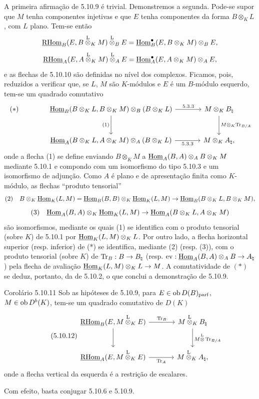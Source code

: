 A primeira afirmação de 5.10.9 é trivial. Demonstremos a segunda. Pode-se supor que $M$ tenha componentes injetivas e que $E$ tenha componentes da forma $B\otimes_KL$, com $L$ plano. Tem-se então
\[
\underline{\mathrm{RHom}}_B(E,B\overset{\mathrm L}{\otimes}_KM)\overset{\mathrm L}{\otimes}_BE=\underline{\operatorname{Hom}}_B^\bullet(E,B\otimes_KM)\otimes_BE,
\]
\[
\underline{\mathrm{RHom}}_A(E,A\overset{\mathrm L}{\otimes}_KM)\overset{\mathrm L}{\otimes}_AE=\underline{\operatorname{Hom}}_A^\bullet(E,A\otimes_KM)\otimes_AE,
\]
e as flechas de 5.10.10 são definidas no nível dos complexos. Ficamos, pois, reduzidos a verificar que, se $L$, $M$ são $K$-módulos e $E$ é um $B$-módulo esquerdo, tem-se um quadrado comutativo
\[
\begin{tikzcd}[column sep=large,row sep=large]
|[alias=star]| {(*)} & \uHom_B(B\otimes_KL,B\otimes_KM)\otimes_B(B\otimes_KL) \arrow[r,"5.3.3"] \arrow[d,"(1)"'] & M\otimes_KB_\natural \arrow[d,"M\otimes_K\Tr_{B/A}"]\\
& \uHom_A(B\otimes_KL,A\otimes_KM)\otimes_A(B\otimes_KL) \arrow[r,"5.3.3"'] & M\otimes_KA_\natural,
\end{tikzcd}
\]
onde a flecha (1) se define enviando $B\otimes_KM$ a $\underline{\operatorname{Hom}}_A(B,A)\otimes_AB\otimes_KM$ mediante 5.10.1 e compondo com um isomorfismo do tipo 5.10.3 e um isomorfismo de adjunção. Como $A$ é plano e de apresentação finita como $K$-módulo, as flechas ``produto tensorial''
\[
\text{(2)}\quad B\otimes_K\underline{\operatorname{Hom}}_K(L,M)=\underline{\operatorname{Hom}}_B(B,B)\otimes_K\underline{\operatorname{Hom}}_K(L,M)\to\underline{\operatorname{Hom}}_B(B\otimes_KL,B\otimes_KM),
\]
\[
\text{(3)}\quad \underline{\operatorname{Hom}}_A(B,A)\otimes_K\underline{\operatorname{Hom}}_K(L,M)\to\underline{\operatorname{Hom}}_A(B\otimes_KL,A\otimes_KM)
\]
são isomorfismos, mediante os quais (1) se identifica com o produto tensorial (sobre $K$) de 5.10.1 por $\underline{\operatorname{Hom}}_K(L,M)\otimes_KL$. Por outro lado, a flecha horizontal superior (resp. inferior) de (*) se identifica, mediante (2) (resp. (3)), com o produto tensorial (sobre $K$) de $\operatorname{Tr}_B:B\to B_\natural$ (resp. $\mathrm{ev}:\underline{\operatorname{Hom}}_A(B,A)\otimes_AB\to A_\natural$) pela flecha de avaliação $\underline{\operatorname{Hom}}_K(L,M)\otimes_KL\to M$. A comutatividade de $(*)$ se deduz, portanto, da de 5.10.2, o que conclui a demonstração de 5.10.9.

\begin{statement}{Corolário 5.10.11}
Sob as hipóteses de 5.10.9, para $E\in\operatorname{ob} D(B)_{\mathrm{parf}}$, $M\in\operatorname{ob} D^b(K)$, tem-se um quadrado comutativo de $D(K)$
\begin{equation}\tag{5.10.12}
\begin{tikzcd}[column sep=large,row sep=large]
\uRHom_B(E,M\lten_KE) \arrow[r,"\Tr_B"] \arrow[d] & M\lten_KB_\natural \arrow[d,"M\lten\Tr_{B/A}"]\\
\uRHom_A(E,M\lten_KE) \arrow[r,"\Tr_A"'] & M\lten_KA_\natural,
\end{tikzcd}
\end{equation}
onde a flecha vertical da esquerda é a restrição de escalares.
\end{statement}

Com efeito, basta conjugar 5.10.6 e 5.10.9.
